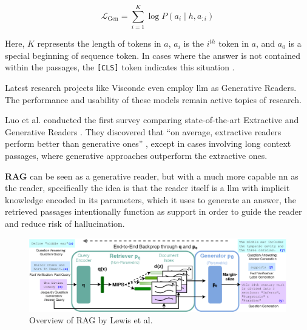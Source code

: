 \begin{equation}
    \mathcal{L}_{\mathrm{Gen}}=\sum_{i=1}^K \log P\left(a_i \mid h, a_{: i}\right)
\end{equation}

Here, $K$ represents the length of tokens in $a$, $a_i$ is the $i^{th}$ token in $a$, and $a_0$ is a special beginning of sequence token. In cases where the answer is not contained within the passages, the \verb|[CLS]| token indicates this situation \cite{luo_choose_2022,zhu_retrieving_2021}.

Latest research projects like Visconde \cite{pereira_visconde_2022} even employ \gls{llm} as Generative Readers. The performance and usability of these models remain active topics of research.

Luo et al. conducted the first survey comparing state-of-the-art Extractive and Generative Readers \cite{luo_choose_2022}. They discovered that \enquote{on average, extractive readers perform better than generative ones} \cite{luo_choose_2022}, except in cases involving long context passages, where generative approaches outperform the extractive ones.

\textbf{RAG} can be seen as a generative reader, but with a much more capable \gls{nn} as the reader, specifically the idea is that the reader itself is a \gls{llm} with implicit knowledge encoded in its parameters, which it uses to generate an answer, the retrieved passages intentionally function as support in order to guide the reader and reduce risk of hallucination. 

\begin{figure}
    \centering
    \includegraphics[width=\textwidth]{Grafiken/RAG-Figure1.png}
    \caption{Overview of RAG by Lewis et al. \cite{lewis_retrieval-augmented_2021}}
    \label{fig:rag}
\end{figure}

